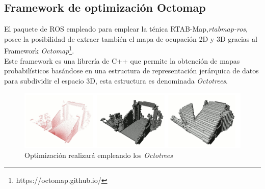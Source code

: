 \subsection{Framework de optimización Octomap}
El paquete de ROS empleado para emplear la ténica RTAB-Map,\textit{rtabmap-ros}, posee la posibilidad de extraer también el mapa de ocupación 2D y 3D gracias al Framework 
\textit{Octomap}\footnote{https://octomap.github.io/}. \\
Este framework es una librería de C++ que permite la obtención de mapas probabilísticos basándose en una estructura de representación jerárquica de datos para subdividir
el espacio 3D, esta estructura es denominada \textit{Octotrees}. \\

\begin{figure}[h!]
    \centering
    \includegraphics[width=.9\textwidth]{images/octomap_beauty}
    \caption{Optimización realizará empleando los \textit{Octotrees}}
\end{figure}


